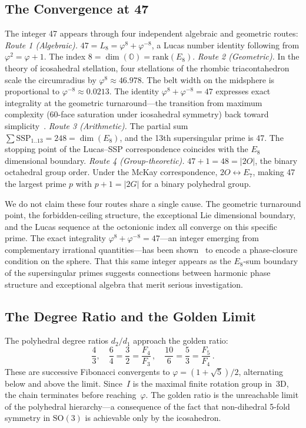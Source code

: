 \documentclass[11pt,letterpaper]{article}
\theoremstyle{definition}
\newcommand{\SSP}{\mathrm{SSP}}
\newcommand{\OO}{\mathbb{O}}
\newcommand{\abs}[1]{\lvert #1 \rvert}
\renewcommand{\phi}{\varphi}
\begin{document}
\subsection{The Convergence at 47}\label{sec:47}
The integer 47 appears through four independent algebraic and geometric routes:
\emph{Route 1 (Algebraic).}  $47 = L_8 = \phi^8+\phi^{-8}$, a Lucas number identity following from $\phi^2=\phi+1$.  The index $8=\dim(\OO)=\mathrm{rank}(E_8)$.
\emph{Route 2 (Geometric).}  In the theory of icosahedral stellation, four stellations of the rhombic triacontahedron scale the circumradius by $\phi^8\approx 46.978$.  The belt width on the midsphere is proportional to $\phi^{-8}\approx 0.0213$.  The identity $\phi^8+\phi^{-8}=47$ expresses exact integrality at the geometric turnaround---the transition from maximum complexity (60-face saturation under icosahedral symmetry) back toward simplicity~\cite{Meucci2026loop}.
\emph{Route 3 (Arithmetic).}  The partial sum $\sum\SSP_{1..13}=248=\dim(E_8)$, and the 13th supersingular prime is 47.  The stopping point of the Lucas--SSP correspondence coincides with the $E_8$ dimensional boundary.
\emph{Route 4 (Group-theoretic).}  $47+1=48=\abs{2O}$, the binary octahedral group order.  Under the McKay correspondence, $2O\leftrightarrow E_7$, making 47 the largest prime $p$ with $p+1=\abs{2G}$ for a binary polyhedral group.
\begin{remarkbox}
We do not claim these four routes share a single cause.  The geometric turnaround point, the forbidden-ceiling structure, the exceptional Lie dimensional boundary, and the Lucas sequence at the octonionic index all converge on this specific prime.  The exact integrality $\phi^8+\phi^{-8}=47$---an integer emerging from complementary irrational quantities---has been shown~\cite{Meucci2026loop} to encode a phase-closure condition on the sphere.  That this same integer appears as the $E_8$-sum boundary of the supersingular primes suggests connections between harmonic phase structure and exceptional algebra that merit serious investigation.
\end{remarkbox}
\subsection{The Degree Ratio and the Golden Limit}
The polyhedral degree ratios $d_2/d_1$ approach the golden ratio:
\[
  \frac{4}{3},\quad \frac{6}{4}=\frac{3}{2}=\frac{F_4}{F_3}\,,\quad \frac{10}{6}=\frac{5}{3}=\frac{F_5}{F_4}\,.
\]
These are successive Fibonacci convergents to $\phi=(1+\sqrt{5})/2$, alternating below and above the limit.  Since~$I$ is the maximal finite rotation group in~3D, the chain terminates before reaching~$\phi$.  The golden ratio is the unreachable limit of the polyhedral hierarchy---a consequence of the fact that non-dihedral 5-fold symmetry in $\mathrm{SO}(3)$ is achievable only by the icosahedron.
\end{document}
